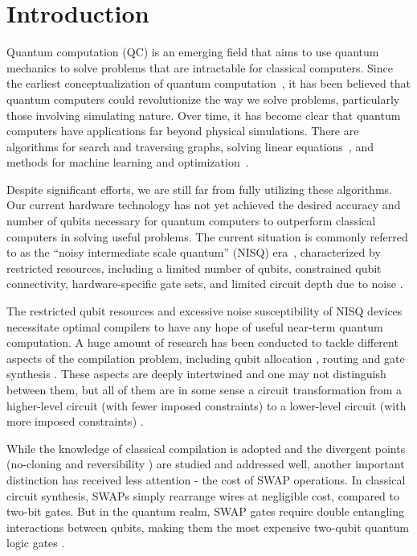 \chapter{Introduction}

Quantum computation (QC) is an emerging field that aims to use quantum mechanics to solve problems that are intractable for classical computers. Since the earliest conceptualization of quantum computation~\cite{feynman1986}, it has been believed that quantum computers could revolutionize the way we solve problems, particularly those involving simulating nature. Over time, it has become clear that quantum computers have applications far beyond physical simulations. There are algorithms for search and traversing graphs, solving linear equations~\cite{montanaro2016}, and methods for machine learning and optimization~\cite{jordan2023}.

Despite significant efforts, we are still far from fully utilizing these algorithms. Our current hardware technology has not yet achieved the desired accuracy and number of qubits necessary for quantum computers to outperform classical computers in solving useful problems. The current situation is commonly referred to as the ``noisy intermediate scale quantum'' (NISQ) era~\cite{preskill2018}, characterized by restricted resources, including a limited number of qubits, constrained qubit connectivity, hardware-specific gate sets, and limited circuit depth due to noise \cite{cross2019}.

The restricted qubit resources and excessive noise susceptibility of NISQ devices necessitate optimal compilers to have any hope of useful near-term quantum computation. A huge amount of research has been conducted to tackle different aspects of the compilation problem, including qubit allocation \cite{itoko2019,siraichi2018,paler2019,zhang2021,li2019}, routing \cite{childs,zhou2020,itoko2019,cowtan2019,nash2020,kissinger2019} and gate synthesis \cite{shende2006,vatan2004,vatan2004a,shende2004,barenco1995,dawson2006}. These aspects are deeply intertwined and one may not distinguish between them, but all of them are in some sense a circuit transformation from a higher-level circuit (with fewer imposed constraints) to a lower-level circuit (with more imposed constraints) \cite{hundt2022}.

While the knowledge of classical compilation is adopted and the divergent points (no-cloning \cite{TODO} and reversibility \cite{shende2003}) are studied and addressed well, another important distinction has received less attention - the cost of SWAP operations. In classical circuit synthesis, SWAPs simply rearrange wires at negligible cost, compared to two-bit gates. But in the quantum realm, SWAP gates require double entangling \cite{TODO} interactions between qubits, making them the most expensive two-qubit quantum logic gates \cite{TODO}.

